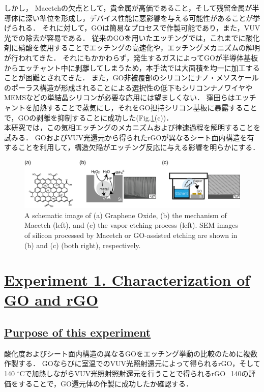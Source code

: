 \documentclass[platex,dvipdfmx]{jlreq}			%
\begin{document}
しかし， Macetchの欠点として，貴金属が高価であること，そして残留金属が半導体に深い準位を形成し\supercite{tavendale_deep_1983}，デバイス性能に悪影響を与える可能性があることが挙げられる．
それに対して，GOは簡易なプロセスで作製可能であり，また，VUV光での除去が容易である．
従来のGOを用いたエッチングでは，これまでに酸化剤に硝酸を使用することでエッチングの高速化や，エッチングメカニズムの解明が行われてきた\supercite{kubota_chemical_2021}．
それにもかかわらず，発生するガスによってGOが半導体基板からエッチャント中に剥離してしまうため，本手法では大面積を均一に加工することが困難とされてきた．
また，GO非被覆部のシリコンにナノ・メソスケールのポーラス構造が形成されることによる選択性の低下もシリコンナノワイヤやMEMSなどの単結晶シリコンが必要な応用には望ましくない．
窪田らはエッチャントを加熱することで蒸気にし，それをGO担持シリコン基板に暴露することで，GOの剥離を抑制することに成功した\supercite{kubota_vapor-phase_2022}(Fig.\ref{fig:schematic_model}(c))．\\
\indent
本研究では，この気相エッチングのメカニズムおよび律速過程を解明することを試みる．
GOおよびVUV光還元から得られたrGOが異なるシート面内構造を有することを利用して，構造欠陥がエッチング反応に与える影響を明らかにする．

\begin{figure}
    \centering
    \includegraphics[width=155mm]{figures/figure1.png}
    \caption{A schematic image of (a) Graphene Oxide, (b) the mechanism of Macetch (left), and (c) the vapor etching process (left). SEM images of silicon processed by Macetch or GO-assisted etching are shown in (b) and (c) (both right), respectively.}
    \label{fig:schematic_model}
\end{figure}

\newpage
\section*{\ul{Experiment 1. Characterization of GO and rGO}}

\subsection*{\ul{Purpose of this experiment}}
酸化度およびシート面内構造の異なるGOをエッチング挙動の比較のために複数作製する．
GOならびに室温でのVUV光照射還元によって得られるrGO，そして140 ${}^\circ$Cで加熱しながらVUV光照射照射還元を行うことで得られるrGO\_140の評価をすることで，GO還元体の作製に成功したか確認する．
\end{document}

